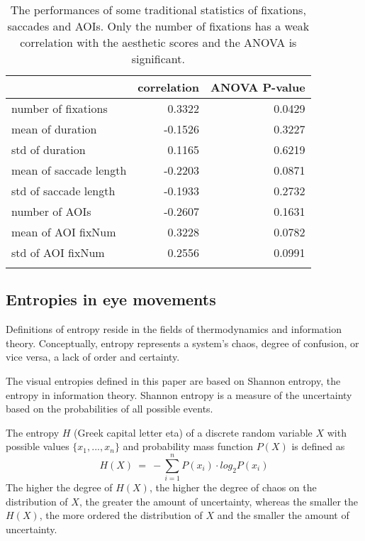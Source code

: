 \begin{table}[H]
  \centering
  \begin{tabular}{lrr}
     &correlation & ANOVA P-value \\
    \hline
    number of fixations & 0.3322 & 0.0429 \\
    mean of duration & -0.1526 & 0.3227 \\
    std of duration & 0.1165 & 0.6219 \\
    mean of saccade length & -0.2203 & 0.0871 \\
    std of saccade length & -0.1933 & 0.2732 \\
    number of AOIs & -0.2607 & 0.1631 \\
    mean of AOI fixNum & 0.3228 & 0.0782 \\
    std of AOI fixNum & 0.2556 & 0.0991 \\
    \\
  \end{tabular}
  \caption{The performances of some traditional statistics of fixations, saccades and AOIs. Only the number of fixations has a weak correlation with the aesthetic scores and the ANOVA is significant.}
  \label{tab:traditional}
\end{table}

\subsection{Entropies in eye movements}
Definitions of entropy reside in the fields of thermodynamics and information theory. Conceptually, entropy represents a system's chaos, degree of confusion, or vice versa, a lack of order and certainty.

The visual entropies defined in this paper are based on Shannon entropy, the entropy in information theory. Shannon entropy is a measure of the uncertainty based on the probabilities of all possible events.

The entropy $H$ (Greek capital letter eta) of a discrete random variable $X$ with possible values $\{x_1, ..., x_n\}$ and probability mass function $P(X)$ is defined as
$$H(X)~=~-\sum_{i=1}^n P(x_i)\cdot log_{2}P(x_i)$$
The higher the degree of $H(X)$, the higher the degree of chaos on the distribution of $X$, the greater the amount of uncertainty, whereas the smaller the $H(X)$, the more ordered the distribution of $X$ and the smaller the amount of uncertainty.


